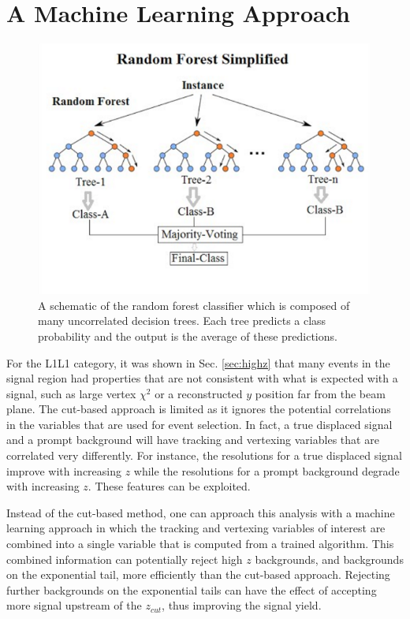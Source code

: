 \clearpage

\section{A Machine Learning Approach}\label{sec:apml}

\begin{figure}[t]
    \centering
    \includegraphics[width=.65\textwidth]{figs/Results/rf.png}
    \caption{A schematic of the random forest classifier which is composed of many uncorrelated decision trees. Each tree predicts a class probability and the output is the average of these predictions.
    }
    \label{fig:rf}
\end{figure}


For the L1L1 category, it was shown in Sec. \ref{sec:highz} that many events in the signal region had properties that are not consistent with what is expected with a signal, such as large vertex $\chi^2$ or a reconstructed $y$ position far from the beam plane. The cut-based approach is limited as it ignores the potential correlations in the variables that are used for event selection. In fact, a true displaced signal and a prompt background will have tracking and vertexing variables that are correlated very differently. For instance, the resolutions for a true displaced signal improve with increasing $z$ while the resolutions for a prompt background degrade with increasing $z$. These features can be exploited.

Instead of the cut-based method, one can approach this analysis with a machine learning approach in which the tracking and vertexing variables of interest are combined into a single variable that is computed from a trained algorithm. This combined information can potentially reject high $z$ backgrounds, and backgrounds on the exponential tail, more efficiently than the cut-based approach. Rejecting further backgrounds on the exponential tails can have the effect of accepting more signal upstream of the $z_{cut}$, thus improving the signal yield.

